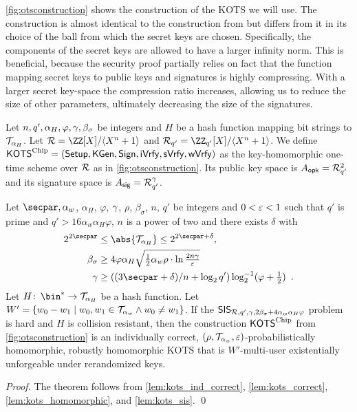 \autoref{fig:otsconstruction} shows the construction of the KOTS we will use.
The construction is almost identical to the construction from \cite{CCS:FleSimZha22} but differs from it in its choice of the ball from which the secret keys are chosen.
Specifically, the components of the secret keys are allowed to have a larger infinity norm.
This is beneficial, because the security proof partially relies on fact that the function mapping secret keys to public keys and signatures is highly compressing.
With a larger secret key-space the compression ratio increases, allowing us to reduce the size of other parameters, ultimately decreasing the size of the signatures.

\begin{definition}\label{def:our_ots}
Let $n, q', \alpha_H, \varphi, \gamma, \beta_\sigma$ be integers and $H$ be a hash function mapping bit strings to $\mathcal{T}_{\alpha_H}$.
Let $\ring = \defring$ and $\ring_{q'} = \defringqq$.
% 
We define $\mathsf{KOTS}^{\textup{Chip}} = (\mathsf{Setup}, \mathsf{KGen}, \mathsf{Sign},\allowbreak \mathsf{iVrfy}, \mathsf{sVrfy}, \mathsf{wVrfy})$ as the key-homomorphic one-time scheme over $\mathcal{R}$ as in \autoref{fig:otsconstruction}.
Its public key space is $A_{\mathsf{opk}} = \mathcal{R}_{q'}^{2}$ and its signature space is $A_{\mathsf{sig}} = \mathcal{R}_{q'}^\gamma$.
\end{definition}


\begin{theorem}\label{theo:kots}
Let $\secpar, \alpha_w$, $\alpha_H$, $\varphi$, $\gamma$, $\rho$, $\beta_\sigma$, $n$, $q'$ be integers and $0 < \varepsilon < 1$ such that $q'$ is prime and $q' > 16\alpha_w\alpha_H\varphi$, $n$ is a power of two and there exists $\delta$ with
\begin{align*}
2^{2\secpar} & \leq \abs{\tern_{\alpha_H}} \leq 2^{2\secpar+\delta},\\
\beta_\sigma & \geq 4\varphi\alpha_H\sqrt{\tfrac{1}{2}\alpha_w\rho \cdot \ln\tfrac{2n\otspkkeylen}{\errorbound} }\\
\otspkkeylen & \geq((3\secpar+\delta)/n+\log_2q')\log^{-1}_2(\varphi+\tfrac{1}{2})\enspace.
\end{align*}
Let $H\colon\, \bin^* \to \tern_{\alpha_H}$ be a hash function.
Let $W' = \{w_0-w_1\mid w_0,w_1\in\mathcal{T}_{\alpha_w} \land w_0\neq w_1\}$.
If the $\mathsf{SIS}_{\mathcal{R},q',\gamma,2\beta_\sigma+4\alpha_w\alpha_H\varphi}$ problem is hard and $H$ is collision resistant,
then the construction $\mathsf{KOTS}^{\textup{Chip}}$ from \autoref{fig:otsconstruction} is an individually correct, $(\rho,\mathcal{T}_{\alpha_w},\varepsilon)$-probabilistically homomorphic, robustly homomorphic KOTS that is $W'$-multi-user existentially unforgeable under rerandomized keys.
\end{theorem}
\begin{proof}
The theorem follows from \autoref{lem:kots_ind_correct}, \autoref{lem:kots_correct}, \autoref{lem:kots_homomorphic}, and \autoref{lem:kots_sis}.
\qed
\end{proof}

